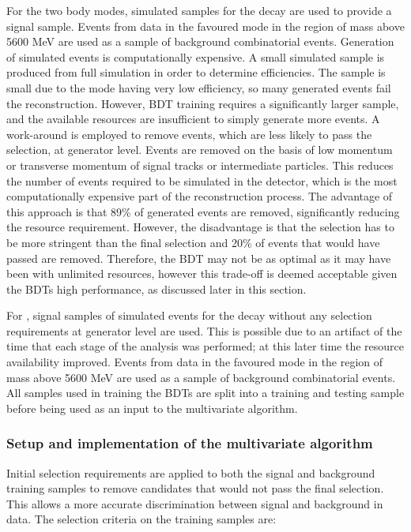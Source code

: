 For the two body modes, simulated samples for the decay \kpi are used to provide a signal sample. Events from data in the favoured \kpi mode in the region of \Bm mass above 5600 MeV are used as a sample of background combinatorial events. Generation of simulated events is computationally expensive. A small simulated sample is produced from full \lhcb simulation in order to determine efficiencies. The sample is small due to the mode having very low efficiency, so many generated events fail the reconstruction. However, BDT training requires a significantly larger sample, and the available resources are insufficient to simply generate more events. A work-around is employed to remove events, which are less likely to pass the selection, at generator level. Events are removed on the basis of low momentum or transverse momentum of signal tracks or intermediate particles. This reduces the number of events required to be simulated in the \lhcb detector, which is the most computationally expensive part of the reconstruction process. The advantage of this approach is that 89\% of generated events are removed, significantly reducing the resource requirement. However, the disadvantage is that the selection has to be more stringent than the final selection and 20\% of events that would have passed are removed. Therefore, the BDT may not be as optimal as it may have been with unlimited resources, however this trade-off is deemed acceptable given the BDTs high performance, as discussed later in this section.

For \kpipipi, signal samples of simulated events for the decay without any selection requirements at generator level are used. This is possible due to an artifact of the time that each stage of the analysis was performed; at this later time the resource availability improved. Events from data in the favoured \kpipipi mode in the region of \Bm mass above 5600 MeV are used as a sample of background combinatorial events. All samples used in training the BDTs are split into a training and testing sample before being used as an input to the multivariate algorithm.

\subsubsection{Setup and implementation of the multivariate algorithm}

Initial selection requirements are applied to both the signal and background training samples to remove candidates that would not pass the final selection. This allows a more accurate discrimination between signal and background in data. The selection criteria on the training samples are:

